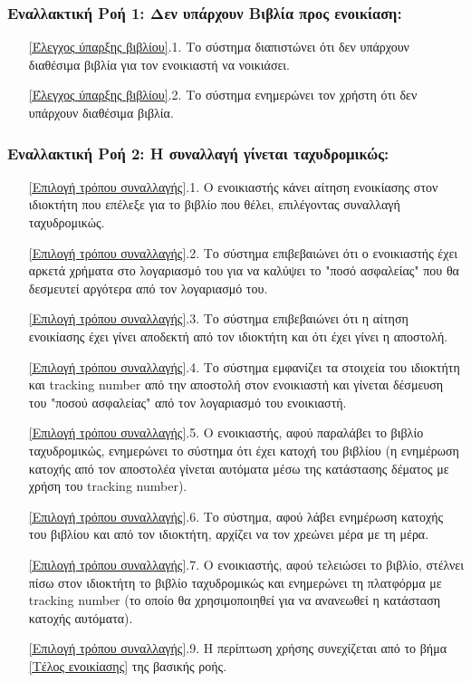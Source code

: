 \documentclass[12pt,a4paper]{article}
\begin{document}
\subsubsection*{Εναλλακτική Ροή 1: Δεν υπάρχουν Βιβλία προς ενοικίαση:}
\begin{enumerate}
    \item[\ref{Έλεγχος ύπαρξης βιβλίου}.1.] Το σύστημα διαπιστώνει ότι δεν υπάρχουν διαθέσιμα βιβλία για τον ενοικιαστή να νοικιάσει.
    \item[\ref{Έλεγχος ύπαρξης βιβλίου}.2.] Το σύστημα ενημερώνει τον χρήστη ότι δεν υπάρχουν διαθέσιμα βιβλία.
\end{enumerate}

\subsubsection*{Εναλλακτική Ροή 2: Η συναλλαγή γίνεται ταχυδρομικώς:}
\begin{enumerate}
    \item[\ref{Επιλογή τρόπου συναλλαγής}.1.] Ο ενοικιαστής κάνει αίτηση ενοικίασης στον ιδιοκτήτη που επέλεξε για το βιβλίο που θέλει, επιλέγοντας συναλλαγή ταχυδρομικώς.
    \item[\ref{Επιλογή τρόπου συναλλαγής}.2.]Το σύστημα επιβεβαιώνει ότι ο ενοικιαστής έχει αρκετά χρήματα στο λογαριασμό του για να καλύψει το "ποσό ασφαλείας" που θα δεσμευτεί αργότερα από τον λογαριασμό του.
    \item[\ref{Επιλογή τρόπου συναλλαγής}.3.] Το σύστημα επιβεβαιώνει ότι η αίτηση ενοικίασης έχει γίνει αποδεκτή από τον ιδιοκτήτη και ότι έχει γίνει η αποστολή.
    \item[\ref{Επιλογή τρόπου συναλλαγής}.4.] Το σύστημα εμφανίζει τα στοιχεία του ιδιοκτήτη και tracking number από την αποστολή στον ενοικιαστή και γίνεται δέσμευση του "ποσού ασφαλείας" από τον λογαριασμό του ενοικιαστή.
    \item[\ref{Επιλογή τρόπου συναλλαγής}.5.] Ο ενοικιαστής, αφού παραλάβει το βιβλίο ταχυδρομικώς, ενημερώνει το σύστημα ότι έχει κατοχή του βιβλίου (η ενημέρωση κατοχής από τον αποστολέα γίνεται αυτόματα μέσω της κατάστασης δέματος με χρήση του tracking number).
    \item[\ref{Επιλογή τρόπου συναλλαγής}.6.] Το σύστημα, αφού λάβει ενημέρωση κατοχής του βιβλίου και από τον ιδιοκτήτη, αρχίζει να τον χρεώνει μέρα με τη μέρα.
    \item[\ref{Επιλογή τρόπου συναλλαγής}.7.] Ο ενοικιαστής, αφού τελειώσει το βιβλίο, στέλνει πίσω στον ιδιοκτήτη το βιβλίο ταχυδρομικώς και ενημερώνει τη πλατφόρμα με tracking number (το οποίο θα χρησιμοποιηθεί για να ανανεωθεί η κατάσταση κατοχής αυτόματα).
    \item[\ref{Επιλογή τρόπου συναλλαγής}.9.] Η περίπτωση χρήσης συνεχίζεται από το βήμα \ref{Τέλος ενοικίασης} της βασικής ροής.
\end{enumerate}
\end{document}
